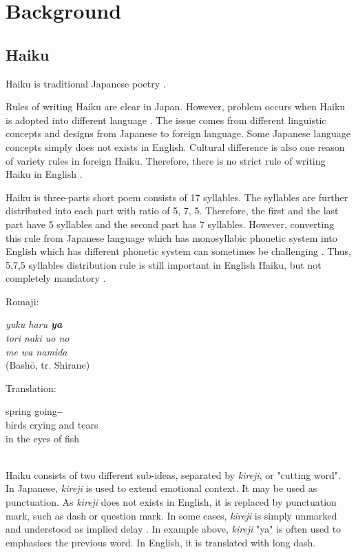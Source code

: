 \section{Background}

\subsection{Haiku}

Haiku is traditional Japanese poetry . 

Rules of writing Haiku are clear in Japan. However, problem occurs when Haiku is adopted into different language \cite{Haiku_poem}. The issue comes from different linguistic concepts and designs from Japanese to foreign language. Some Japanese language concepts simply does not exists in English. Cultural difference is also one reason of variety rules in foreign Haiku. Therefore, there is no strict rule of writing Haiku in English \cite{Haiku_JP}.

Haiku is three-parts short poem consists of 17 syllables. The syllables are further distributed into each part with ratio of 5, 7, 5. Therefore, the first and the last part have 5 syllables and the second part has 7 syllables. However, converting this rule from Japanese language which has monosyllabic phonetic system into English which has different phonetic system can sometimes be challenging  \cite{Haiku_poem}. Thus, 5,7,5 syllables distribution rule is still important in English Haiku, but not completely mandatory \cite{Haiku_JP}.


Romaji:
\\
{\centering\textit{
		yuku haru \textbf{ya} \\
		tori naki uo no \\
		me wa namida}  \\
	(Bashō, tr. Shirane)
	\par
}

Translation:\\
{\centering
	spring going\textbf{--} \\
	birds crying and tears \\
	in the eyes of fish
	\par
}

~\\

Haiku consists of two different sub-ideas, separated by \textit{kireji}, or "cutting word". In Japanese, \textit{kireji} is used to extend emotional context. It may be used as punctuation. As \textit{kireji} does not exists in English, it is replaced by punctuation mark, such as dash or question mark. In some cases, \textit{kireji} is simply unmarked and understood as implied delay \cite{Haiku_kireji}. In example above, \textit{kireji} "ya" is often used to emphasises the previous word. In English, it is translated with long dash.


